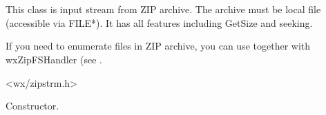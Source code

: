 %
%

\section{}\label{wxzipinputstream}

This class is input stream from ZIP archive. The archive
must be local file (accessible via FILE*).
It has all features including GetSize and seeking.


If you need to enumerate files in ZIP archive, you can use 
 together with wxZipFSHandler (see 
.





<wx/zipstrm.h>


\label{wxzipinputstreamwxzipinputstream}


Constructor.




